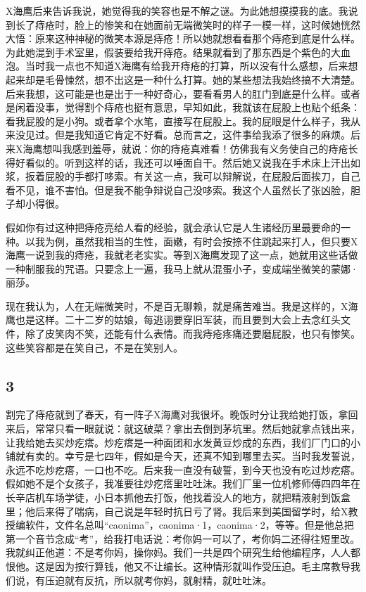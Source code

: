 X海鹰后来告诉我说，她觉得我的笑容也是不解之谜。为此她想摸摸我的底。我说到长了痔疮时，脸上的惨笑和在她面前无端微笑时的样子一模一样，这时候她恍然大悟：原来这种神秘的微笑本源是痔疮！所以她就想看看那个痔疮到底是什么样。为此她混到手术室里，假装要给我开痔疮。结果就看到了那东西是个紫色的大血泡。当时我一点也不知道X海鹰有给我开痔疮的打算，所以没有什么感想，后来想起来却是毛骨悚然，想不出这是一种什么打算。她的某些想法我始终搞不大清楚。后来我想，这可能是也是出于一种好奇心，要看看男人的肛门到底是什么样。或者是闲着没事，觉得割个痔疮也挺有意思，早知如此，我就该在屁股上也贴个纸条：看我屁股的是小狗。或者拿个水笔，直接写在屁股上。我的屁眼是什么样子，我从来没见过。但是我知道它肯定不好看。总而言之，这件事给我添了很多的麻烦。后来X海鹰想叫我感到羞辱，就说：你的痔疮真难看！仿佛我有义务使自己的痔疮长得好看似的。听到这样的话，我还可以唾面自干。然后她又说我在手术床上汗出如浆，扳着屁股的手都打哆索。有关这一点，我可以辩解说，在屁股后面挨刀，自己看不见，谁不害怕。但是我不能争辩说自己没哆索。我这个人虽然长了张凶脸，胆子却小得很。 

假如你有过这种把痔疮亮给人看的经验，就会承认它是人生诸经历里最要命的一种。以我为例，虽然我相当的生性，面嫩，有时会按捺不住跳起来打人，但只要X海鹰一说到我的痔疮，我就老老实实。等到X海鹰发现了这一点，她就用这些话做一种制服我的咒语。只要念上一遍，我马上就从混蛋小子，变成端坐微笑的蒙娜·丽莎。 

现在我认为，人在无端微笑时，不是百无聊赖，就是痛苦难当。我是这样的，X海鹰也是这样。二十二岁的姑娘，每逃诩要穿旧军装，而且要到大会上去念红头文件，除了皮笑肉不笑，还能有什么表情。而我痔疮疼痛还要磨屁股，也只有惨笑。这些笑容都是在笑自己，不是在笑别人。 

\subsection{3} 

割完了痔疮就到了春天，有一阵子X海鹰对我很坏。晚饭时分让我给她打饭，拿回来后，常常只看一眼就说：就这破菜？拿出去倒到茅坑里。然后她就拿点钱出来，让我给她去买炒疙瘩。炒疙瘩是一种面团和水发黄豆炒成的东西，我们厂门口的小铺就有卖的。幸亏是七四年，假如是今天，还真不知到哪里去买。当时我发誓说，永远不吃炒疙瘩，一口也不吃。后来我一直没有破誓，到今天也没有吃过炒疙瘩。假如她不是个女孩子，我准要往炒疙瘩里吐吐沫。我们厂里一位机修师傅四四年在长辛店机车场学徒，小日本抓他去打饭，他找着没人的地方，就把精液射到饭盒里；他后来得了喘病，自己说是年轻时抗日亏了肾。我后来到美国留学时，给X教授编软件，文件名总叫“caonima”，caonima·1，caonima·2，等等。但是他总把第一个音节念成“考”，给我打电话说：考你妈一可以了，考你妈二还得往短里改。我就纠正他道：不是考你妈，操你妈。我们一共是四个研究生给他编程序，人人都恨他。这是因为按行算钱，他又不让编长。这种情形就叫作受压迫。毛主席教导我们说，有压迫就有反抗，所以就考你妈，就射精，就吐吐沫。 

